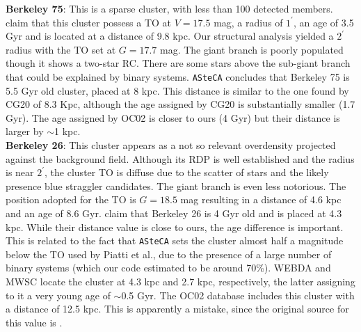 \documentclass[referee]{aa}
\begin{document}
\begin{appendix}
  \noindent \textbf{Berkeley 75}: This is a sparse cluster, with less than 100
  detected members. \cite{Carraro_2005} claim that this cluster possess
  a TO at $V= 17.5$ mag, a radius of $1^{\prime}$, an age of 3.5 Gyr and is
  located at a distance of 9.8 kpc.
  Our structural analysis yielded a $2^{\prime}$ radius with the TO set at
  $G=17.7$ mag. The giant branch is poorly populated though it shows a two-star
  RC. There are some stars above the sub-giant branch that could be explained
  by binary systems. \texttt{ASteCA} concludes that Berkeley 75 is 5.5 Gyr old
  cluster, placed at 8 kpc. This distance is similar to the one found by CG20
  of 8.3 Kpc, although the age assigned by CG20 is substantially smaller (1.7
  Gyr). The age assigned by OC02 is closer to ours (4 Gyr) but their distance is
  larger by $\sim$1 kpc.\\

  \noindent \textbf{Berkeley 26}: This cluster appears as a not so relevant overdensity
  projected against the background field. Although its RDP is well established
  and the radius is near $2^{\prime}$, the cluster TO is diffuse due to the
  scatter of stars and the likely presence blue straggler candidates. The
  giant branch is even less notorious.
  The position adopted for the TO is $G=18.5$ mag resulting in a distance of 4.6
  kpc and an age of 8.6 Gyr. \cite{Piatti_2010} claim that Berkeley 26 is 4 Gyr
  old and is placed at 4.3 kpc. While their distance value is close to ours, the
  age difference is important. This is related to the fact that \texttt{ASteCA}
  sets the cluster almost half a magnitude below the TO used by Piatti et al.,
  due to the presence of a large number of binary systems (which our code
  estimated to be around 70\%).
  WEBDA and MWSC locate the cluster at 4.3 kpc and 2.7 kpc, respectively, the
  latter assigning to it a very young age of $\sim$0.5 Gyr. The OC02 database
  includes this cluster with a distance of 12.5 kpc. This is apparently
  a mistake, since the original source for this value is \cite{Piatti_2010}.\\


\end{appendix}
\end{document}
